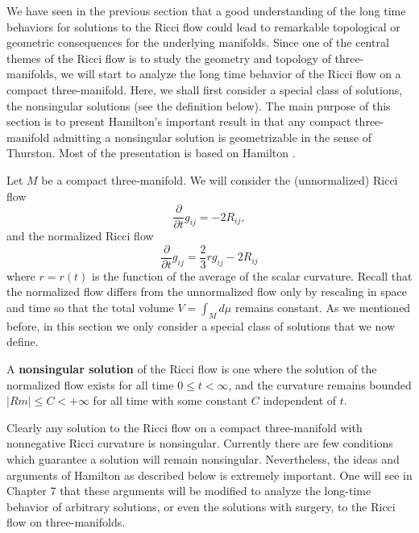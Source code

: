 We have seen in the previous section that a good understanding of
the long time behaviors for solutions to the Ricci flow could lead
to remarkable topological or geometric consequences for the
underlying manifolds. Since one of the central themes of the Ricci
flow is to study the geometry and topology of three-manifolds, we
will start to analyze the long time behavior of the Ricci flow on
a compact three-manifold. Here, we shall first consider a special
class of solutions, the nonsingular solutions (see the definition
below). The main purpose of this section is to present Hamilton's
important result in \cite{Ha99} that any compact three-manifold
admitting a nonsingular solution is geometrizable in the sense of
Thurston\cite{Th82}. Most of the presentation is based on Hamilton
\cite{Ha99}.

Let $M$ be a compact three-manifold. We will consider the
(unnormalized) Ricci flow
$$
\frac{\partial}{\partial t}g_{ij}=-2R_{ij},
$$
and the normalized Ricci flow
$$
\frac{\partial}{\partial t}g_{ij}=\frac{2}{3}rg_{ij}-2R_{ij}
$$
where $r=r(t)$ is the function of the average of the scalar
curvature. Recall that the normalized flow differs from the
unnormalized flow only by rescaling in space and time so that the
total volume $V=\int_Md\mu$ remains constant. As we mentioned
before, in this section we only consider a special class of
solutions that we now define.

\begin{definition}
  \label{def:cz-nonsingular-normalized-ricci-flow}

A {\bf nonsingular solution} of the
Ricci flow is one where the solution of the normalized flow exists
for all time $0\leq t<\infty$, and the curvature remains bounded
$|Rm|\leq C<+\infty$ for all time with some constant $C$
independent of $t$.
\end{definition}

Clearly any solution to the Ricci flow on a compact three-manifold
with nonnegative Ricci curvature is nonsingular. Currently there
are few conditions which guarantee a solution will remain
nonsingular. Nevertheless, the ideas and arguments of Hamilton
\cite{Ha99} as described below is extremely important. One will
see in Chapter 7 that these arguments will be modified to analyze
the long-time behavior of arbitrary solutions, or even the
solutions with surgery, to the Ricci flow on three-manifolds.

